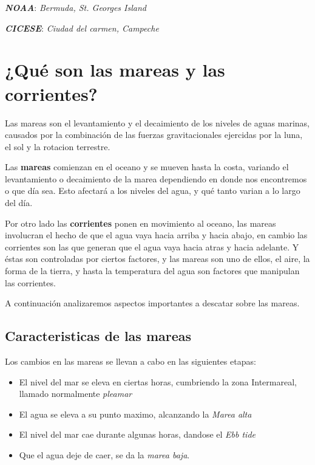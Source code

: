 \documentclass[12pt]{article}
\begin{document}
\textbf{\textit{NOAA}}:  	
\textit{Bermuda, St. Georges Island} 

\textbf{\textit{CICESE}}: 
\textit{Ciudad del carmen, Campeche} 
\section{¿Qué son las mareas y las corrientes?}
Las mareas son el levantamiento y el decaimiento de los niveles de aguas marinas, causados por la combinación de las fuerzas gravitacionales ejercidas por la luna, el sol y la rotacion terrestre. 

Las \textbf{mareas} comienzan en el oceano y se mueven hasta la costa, variando el levantamiento o decaimiento de la marea dependiendo en donde nos encontremos o que día sea. Esto afectará a los niveles del agua, y qué tanto varian a lo largo del día.

Por otro lado las \textbf{corrientes} ponen en movimiento al oceano, las mareas involucran el hecho de que el agua vaya hacia arriba y hacia abajo, en cambio las corrientes son las que generan que el agua vaya hacia atras y hacia adelante. Y éstas son controladas por ciertos factores, y las mareas son uno de ellos, el aire, la forma de la tierra, y hasta la temperatura del agua son factores que manipulan las corrientes. 


A continuación analizaremos aspectos importantes a descatar sobre las mareas.

\subsection{Caracteristicas de las mareas}
Los cambios en las mareas se llevan a cabo en las siguientes etapas:

\begin{itemize}
\item El nivel del mar se eleva en ciertas horas, cumbriendo la zona Intermareal, llamado normalmente \textit{pleamar}
\item El agua se eleva a su punto maximo, alcanzando la \textit{Marea alta}
\item El nivel del mar cae durante algunas horas, dandose el \textit{Ebb tide}
\item Que el agua deje de caer, se da la \textit{marea baja}.
\end{itemize}
\end{document}
